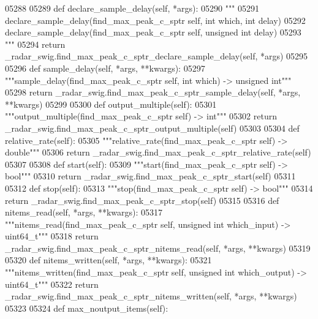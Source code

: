 \begin{DoxyCode}
{{{{{{{{{{{{{{{{{{05288 
05289     \textcolor{keyword}{def }declare_sample_delay(self, *args):
05290         \textcolor{stringliteral}{"""}
05291 \textcolor{stringliteral}{        declare\_sample\_delay(find\_max\_peak\_c\_sptr self, int which, int delay)}
05292 \textcolor{stringliteral}{        declare\_sample\_delay(find\_max\_peak\_c\_sptr self, unsigned int delay)}
05293 \textcolor{stringliteral}{        """}
05294         \textcolor{keywordflow}{return} \_radar\_swig.find\_max\_peak\_c\_sptr\_declare\_sample\_delay(self, *args)
05295 
05296     \textcolor{keyword}{def }sample_delay(self, *args, **kwargs):
05297         \textcolor{stringliteral}{"""sample\_delay(find\_max\_peak\_c\_sptr self, int which) -> unsigned int"""}
05298         \textcolor{keywordflow}{return} \_radar\_swig.find\_max\_peak\_c\_sptr\_sample\_delay(self, *args, **kwargs)
05299 
05300     \textcolor{keyword}{def }output_multiple(self):
05301         \textcolor{stringliteral}{"""output\_multiple(find\_max\_peak\_c\_sptr self) -> int"""}
05302         \textcolor{keywordflow}{return} \_radar\_swig.find\_max\_peak\_c\_sptr\_output\_multiple(self)
05303 
05304     \textcolor{keyword}{def }relative_rate(self):
05305         \textcolor{stringliteral}{"""relative\_rate(find\_max\_peak\_c\_sptr self) -> double"""}
05306         \textcolor{keywordflow}{return} \_radar\_swig.find\_max\_peak\_c\_sptr\_relative\_rate(self)
05307 
05308     \textcolor{keyword}{def }start(self):
05309         \textcolor{stringliteral}{"""start(find\_max\_peak\_c\_sptr self) -> bool"""}
05310         \textcolor{keywordflow}{return} \_radar\_swig.find\_max\_peak\_c\_sptr\_start(self)
05311 
05312     \textcolor{keyword}{def }stop(self):
05313         \textcolor{stringliteral}{"""stop(find\_max\_peak\_c\_sptr self) -> bool"""}
05314         \textcolor{keywordflow}{return} \_radar\_swig.find\_max\_peak\_c\_sptr\_stop(self)
05315 
05316     \textcolor{keyword}{def }nitems_read(self, *args, **kwargs):
05317         \textcolor{stringliteral}{"""nitems\_read(find\_max\_peak\_c\_sptr self, unsigned int which\_input) -> uint64\_t"""}
05318         \textcolor{keywordflow}{return} \_radar\_swig.find\_max\_peak\_c\_sptr\_nitems\_read(self, *args, **kwargs)
05319 
05320     \textcolor{keyword}{def }nitems_written(self, *args, **kwargs):
05321         \textcolor{stringliteral}{"""nitems\_written(find\_max\_peak\_c\_sptr self, unsigned int which\_output) -> uint64\_t"""}
05322         \textcolor{keywordflow}{return} \_radar\_swig.find\_max\_peak\_c\_sptr\_nitems\_written(self, *args, **kwargs)
05323 
05324     \textcolor{keyword}{def }max_noutput_items(self):
}}}}}}}}}}}}}}}}}}
\end{DoxyCode}
